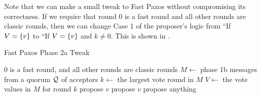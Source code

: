 Note that we can make a small tweak to Fast Paxos without compromising its
correctness. If we require that round $0$ is a fast round and all other rounds
are classic rounds, then we can change Case 1 of the proposer's logic from ``If
$V = \{v\}$ to ``If $V = \{v\}$ and $k \neq 0$. This is shown in
.

\begin{algorithm}[ht]
  \caption{Fast Paxos Phase 2a Tweak}%
  \begin{algorithmic}[1]
    \Require{} $0$ is a fast round, and all other rounds are classic rounds
    \State{} $M \gets$ phase 1b messages from a quorum $\mathcal{Q}$ of acceptors
    \State{} $k \gets$ the largest vote round in $M$
    \State{} $V \gets$ the vote values in $M$ for round $k$
      \State{} propose $v$
      \State{} propose $v$
    \Else{}
      \State{} propose anything
    \EndIf{}
  \end{algorithmic}
\end{algorithm}

